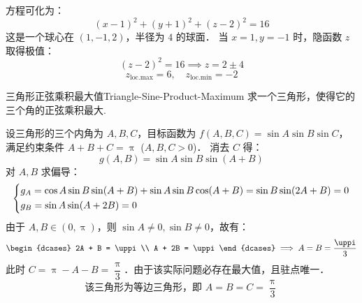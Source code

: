 \begin{solution}
    方程可化为：
    \begin{equation}
        (x - 1)^2 + (y + 1)^2 + (z - 2)^2 = 16
    \end{equation}
    这是一个球心在 $(1, -1, 2)$，半径为 $4$ 的球面．
    当 $x = 1, y = -1$ 时，隐函数 $z$ 取得极值：
    \begin{equation}
        (z - 2)^2 = 16 \implies z = 2 \pm 4
    \end{equation}
    \begin{equation}
        \boxed{z_{\text{loc.max}} = 6, \quad z_{\text{loc.min}} = -2}
    \end{equation}
\end{solution}

\begin{problem}{三角形正弦乘积最大值}{Triangle-Sine-Product-Maximum}
    求一个三角形，使得它的三个角的正弦乘积最大.
\end{problem}

\begin{solution}
    设三角形的三个内角为 $A, B, C$，目标函数为 $f(A, B, C) = \sin A \sin B \sin C$，满足约束条件 $A + B + C = \uppi$ ($A, B, C > 0$)．
    消去 $C$ 得：
    \begin{equation}
        g(A, B) = \sin A \sin B \sin(A + B)
    \end{equation}
    对 $A, B$ 求偏导：
    \begin{equation}
        \begin{dcases}
            g_A = \cos A \sin B \sin(A+B) + \sin A \sin B \cos(A+B) = \sin B \sin(2A+B) = 0 \\
            g_B = \sin A \sin(A+2B) = 0
        \end{dcases}
    \end{equation}
    由于 $A, B \in (0, \uppi)$，则 $\sin A \neq 0, \sin B \neq 0$，故有：
    \begin{equation}
        \begin{dcases}
            2A + B = \uppi \\
            A + 2B = \uppi
        \end{dcases} \implies A = B = \frac{\uppi}{3}
    \end{equation}
    此时 $C = \uppi - A - B = \dfrac{\uppi}{3}$．由于该实际问题必存在最大值，且驻点唯一．
    \begin{equation}
        \boxed{\text{该三角形为等边三角形，即 } A = B = C = \frac{\uppi}{3}}
    \end{equation}
\end{solution}


